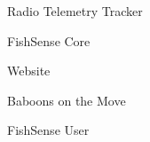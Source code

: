 \item Radio Telemetry Tracker
\item FishSense Core
\item Website
\item Baboons on the Move
\item FishSense User
